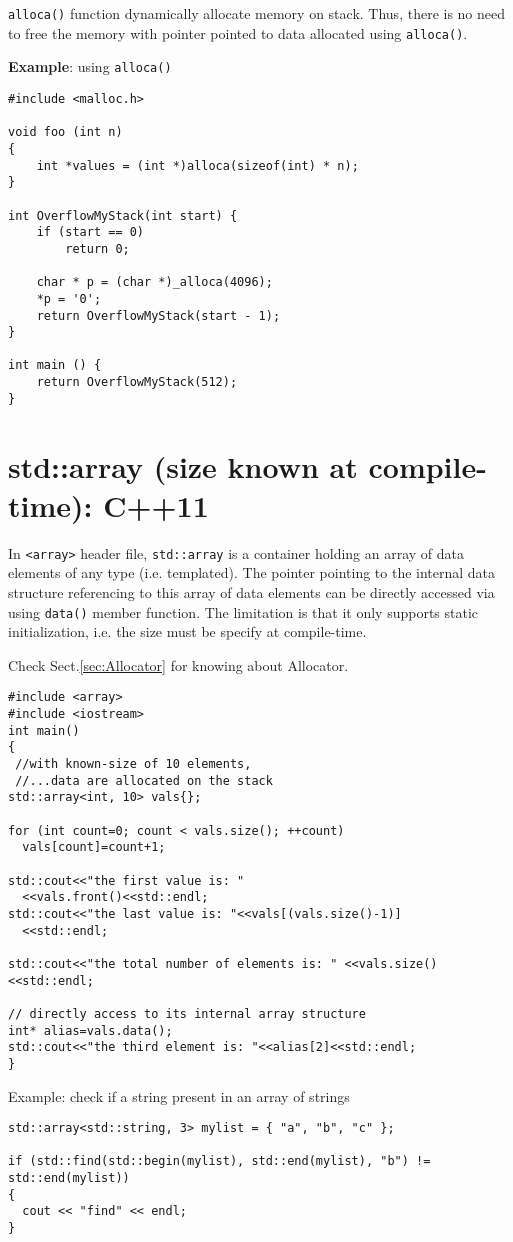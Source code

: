 \verb!alloca()! function dynamically allocate memory on stack. Thus, there is no
need to free the memory with pointer pointed to data allocated using
\verb!alloca()!.


{\bf Example}: using \verb!alloca()!
\begin{Verbatim}
#include <malloc.h>

void foo (int n)
{
    int *values = (int *)alloca(sizeof(int) * n);
}

int OverflowMyStack(int start) {
    if (start == 0)
        return 0;

    char * p = (char *)_alloca(4096);
    *p = '0';
    return OverflowMyStack(start - 1);
}

int main () {
    return OverflowMyStack(512);
} 
\end{Verbatim}

\section{std::array (size known at compile-time): C++11}
\label{sec:std::array}


In \verb!<array>! header file, \verb!std::array! is a container holding an array
of data elements of any type (i.e. templated). The pointer pointing to the
internal data structure referencing to this array of data elements can be directly accessed via using
\verb!data()! member function. The limitation is that it only supports static
initialization, i.e. the size must be specify at compile-time.

Check Sect.\ref{sec:Allocator} for knowing about Allocator.
\begin{verbatim}
#include <array>
#include <iostream>
int main()
{
 //with known-size of 10 elements, 
 //...data are allocated on the stack
std::array<int, 10> vals{};
 
for (int count=0; count < vals.size(); ++count)
  vals[count]=count+1;
  
std::cout<<"the first value is: "    
  <<vals.front()<<std::endl;  
std::cout<<"the last value is: "<<vals[(vals.size()-1)]  
  <<std::endl;
  
std::cout<<"the total number of elements is: " <<vals.size()<<std::endl;

// directly access to its internal array structure
int* alias=vals.data(); 
std::cout<<"the third element is: "<<alias[2]<<std::endl;
}
\end{verbatim}

Example: check if a string present in an array of strings
\begin{lstlisting}
std::array<std::string, 3> mylist = { "a", "b", "c" };

if (std::find(std::begin(mylist), std::end(mylist), "b") != std::end(mylist))
{
  cout << "find" << endl;
}
\end{lstlisting}

